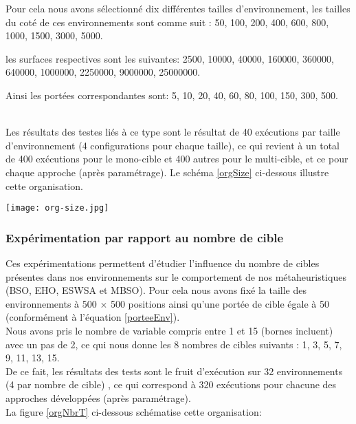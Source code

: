 Pour cela nous avons sélectionné dix différentes tailles d'environnement, les tailles du coté de ces environnements sont comme suit : 50, 100, 200, 400, 600, 800, 1000, 1500, 3000, 5000.

les surfaces respectives sont les suivantes: 2500, 10000, 40000, 160000, 360000, 640000, 1000000, 2250000, 9000000, 25000000.

Ainsi les portées correspondantes sont: 5, 10, 20, 40, 60, 80, 100, 150, 300, 500.


\textbf{ }\\
Les résultats des testes liés à ce type sont le résultat de 40 exécutions par taille d'environnement (4 configurations pour chaque taille), ce qui revient à un total de 400 exécutions pour le mono-cible et 400 autres pour le multi-cible, et ce pour chaque approche (après paramétrage). Le schéma \ref{orgSize} ci-dessous illustre cette organisation.

\begin{center}	  
	\texttt{[image: org-size.jpg]}%
	\vspace{-0.1 cm}
	\label{orgSize}%
\end{center}

\subsubsection{Expérimentation par rapport au nombre de cible}
Ces expérimentations permettent d'étudier l'influence du nombre de cibles présentes dans nos environnements sur le comportement de nos métaheuristiques (BSO, EHO, ESWSA et MBSO).
Pour cela nous avons fixé la taille des environnements à 500 $\times$ 500 positions ainsi qu'une portée de cible égale à 50 (conformément à l'équation \ref{porteeEnv}).\\

Nous avons pris le nombre de variable compris entre 1 et 15 (bornes incluent) avec un pas de 2, ce qui nous donne les 8 nombres de cibles suivants : 1, 3, 5, 7, 9, 11, 13, 15.\\

De ce fait, les résultats des tests sont le fruit d'exécution sur 32 environnements (4 par nombre de cible) , ce qui correspond à 320 exécutions pour chacune des approches développées (après paramétrage).\\
La figure \ref{orgNbrT} ci-dessous schématise cette organisation:

